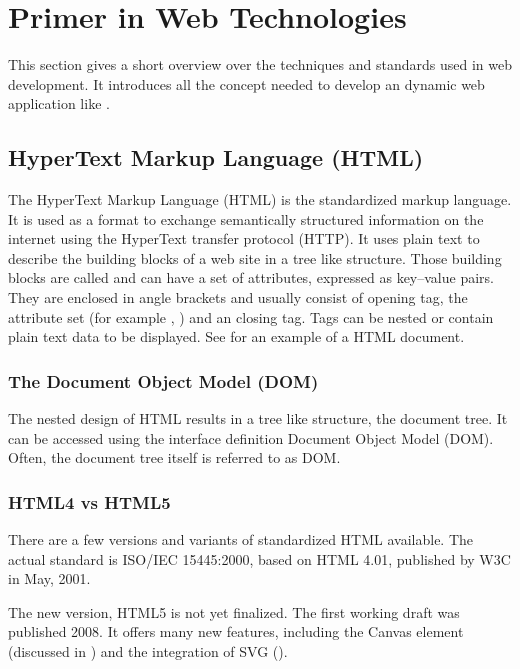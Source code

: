 \section{Primer in Web Technologies}
\label{sec:primer}

This section gives a short overview over the techniques and standards used in web development.
It introduces all the concept needed to develop an dynamic web application like \spl.



\subsection{HyperText Markup Language (HTML)}
The HyperText Markup Language (HTML) is the standardized markup language.
It is used as a format to exchange semantically structured information on the internet using the HyperText transfer protocol (HTTP).
It uses plain text to describe the building blocks of a web site in a tree like structure.
Those building blocks are called  and can have a set of attributes, expressed as key--value pairs.
They are enclosed in angle brackets and usually consist of opening tag, the attribute set (for example , ) and an closing tag.
Tags can be nested or contain plain text data to be displayed.
See  for an example of a HTML document.


\subsubsection{The Document Object Model (DOM)}
The nested design of HTML results in a tree like structure, the document tree.
It can be accessed using the interface definition Document Object Model (DOM).
Often, the document tree itself is referred to as DOM.


\subsubsection{HTML4 vs HTML5}

There are a few versions and variants of standardized HTML available.
The actual standard is ISO/IEC 15445:2000\cite{isohtml}, based on HTML 4.01, published by W3C in May, 2001.

The new version, HTML5 is not yet finalized.
The first working draft was published 2008\cite{html5_draft}.
It offers many new features, including the Canvas element (discussed in ) and the integration of SVG ().


